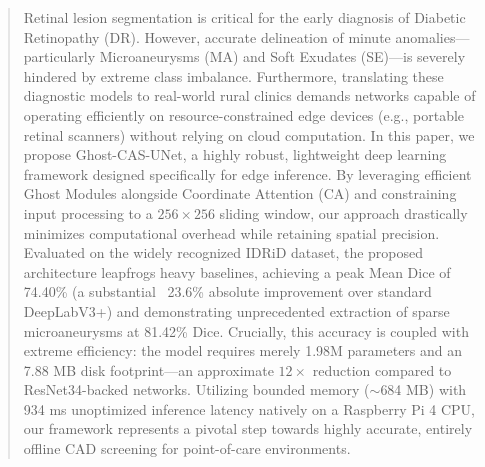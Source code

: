 \begin{abstract}
Retinal lesion segmentation is critical for the early diagnosis of Diabetic Retinopathy (DR). However, accurate delineation of minute anomalies—particularly Microaneurysms (MA) and Soft Exudates (SE)—is severely hindered by extreme class imbalance. Furthermore, translating these diagnostic models to real-world rural clinics demands networks capable of operating efficiently on resource-constrained edge devices (e.g., portable retinal scanners) without relying on cloud computation. In this paper, we propose Ghost-CAS-UNet, a highly robust, lightweight deep learning framework designed specifically for edge inference. By leveraging efficient Ghost Modules alongside Coordinate Attention (CA) and constraining input processing to a $256 \times 256$ sliding window, our approach drastically minimizes computational overhead while retaining spatial precision. Evaluated on the widely recognized IDRiD dataset, the proposed architecture leapfrogs heavy baselines, achieving a peak Mean Dice of 74.40\% (a substantial ~23.6\% absolute improvement over standard DeepLabV3+) and demonstrating unprecedented extraction of sparse microaneurysms at 81.42\% Dice. Crucially, this accuracy is coupled with extreme efficiency: the model requires merely 1.98M parameters and an 7.88 MB disk footprint—an approximate $12\times$ reduction compared to ResNet34-backed networks. Utilizing bounded memory ($\sim$684 MB) with 934 ms unoptimized inference latency natively on a Raspberry Pi 4 CPU, our framework represents a pivotal step towards highly accurate, entirely offline CAD screening for point-of-care environments.
\end{abstract}

